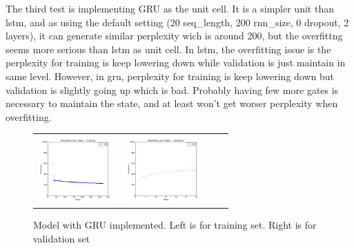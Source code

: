 \documentclass{article}
\begin{document}
The third test is implementing GRU as the unit cell. It is a simpler unit than lstm, and as using the default setting (20 seq\_length, 200 rnn\_size, 0 dropout, 2 layers), it can generate similar perplexity wich is around 200, but the overfittng seems more serious than lstm as unit cell. In lstm, the overfitting issue is the perplexity for training is keep lowering down while validation is just maintain in same level. However, in gru, perplexity for training is keep lowering down but validation is slightly going up which is bad. Probably having few more gates is necessary to maintain the state, and at least won't get worser perplexity when overfitting.
\begin{figure}[h]
\centering
\begin{subfigure}
  \begin{tabular}{cccc}
  {\includegraphics[width = 30mm]{../lstm_me/fig/GRU_train.png}}&
  {\includegraphics[width = 30mm]{../lstm_me/fig/GRU_val.png}}
  \end{tabular}
\end{subfigure}
\caption{Model with GRU implemented. Left is for training set. Right is for validation set}
\end{figure}

\end{document}
